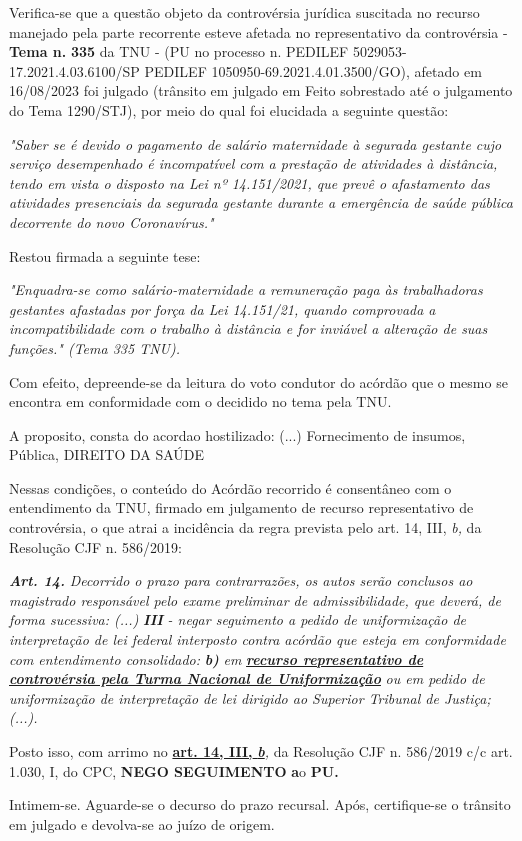 \documentclass[12pt]{article}
\begin{document}
\justifying
\noindent Verifica-se que a questão objeto da controvérsia jurídica suscitada no recurso manejado pela parte recorrente esteve afetada no representativo da controvérsia - \textbf{Tema n. }\textbf{335} da TNU - (PU no processo n. PEDILEF 5029053-17.2021.4.03.6100/SP PEDILEF 1050950-69.2021.4.01.3500/GO),  afetado em 16/08/2023 foi julgado (trânsito em julgado em Feito sobrestado até o julgamento do Tema 1290/STJ), por meio do qual foi elucidada a seguinte questão:

\noindent \textit{"Saber se é devido o pagamento de salário maternidade à segurada gestante cujo serviço desempenhado é incompatível com a prestação de atividades à distância, tendo em vista o disposto na Lei nº 14.151/2021, que prevê o afastamento das atividades presenciais da segurada gestante durante a emergência de saúde pública decorrente do novo Coronavírus."}

\noindent Restou firmada a seguinte tese:

\noindent \textit{"Enquadra-se como salário-maternidade a remuneração paga às trabalhadoras gestantes afastadas por força da Lei 14.151/21, quando comprovada a incompatibilidade com o trabalho à distância e for inviável a alteração de suas funções." (Tema 335 TNU).}

\noindent Com efeito, depreende-se da leitura do voto condutor do acórdão que o mesmo se encontra em conformidade com o decidido no  tema pela TNU.

\noindent A proposito, consta do acordao hostilizado: (...) Fornecimento de insumos, Pública, DIREITO DA SAÚDE

\noindent Nessas condições, o conteúdo do Acórdão recorrido é consentâneo com o entendimento da TNU, firmado em julgamento de recurso representativo de controvérsia, o que atrai a incidência da regra prevista pelo art. 14, III, \textit{b,} da Resolução CJF n. 586/2019:

\noindent \textit{\textbf{Art. 14.}}\textit{ Decorrido o prazo para contrarrazões, os autos serão conclusos ao magistrado responsável pelo exame preliminar de admissibilidade, que deverá, de forma sucessiva: (...) }\textit{\textbf{III }}\textit{- negar seguimento a pedido de uniformização de interpretação de lei federal interposto contra acórdão que esteja em conformidade com entendimento consolidado: }\textit{\textbf{b)}}\textit{ em }\uline{\textit{\textbf{recurso representativo de controvérsia pela Turma Nacional de Uniformização}}}\textit{ ou em pedido de uniformização de interpretação de lei dirigido ao Superior Tribunal de Justiça;(...).}

\noindent Posto isso, com arrimo no \uline{\textbf{art. 14, III, }}\uline{\textit{\textbf{b}}}\textit{,} da Resolução CJF n. 586/2019 c/c art. 1.030, I, do CPC, \textbf{NEGO SEGUIMENTO }\textbf{a}o\textbf{ PU}\textbf{.}

\noindent Intimem-se. Aguarde-se o decurso do prazo recursal. Após, certifique-se o trânsito em julgado e devolva-se ao juízo de origem.
\end{document}
